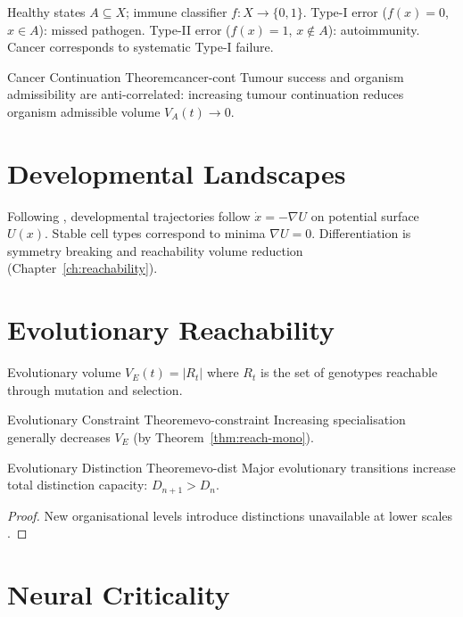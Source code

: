 \documentclass[12pt,twoside,openright]{book}
\begin{document}
Healthy states $A \subseteq X$; immune classifier
$f: X \to \{0,1\}$.
Type-I error ($f(x)=0$, $x \in A$): missed pathogen.
Type-II error ($f(x)=1$, $x \notin A$): autoimmunity.
Cancer corresponds to systematic Type-I failure.

\begin{theorem}{Cancer Continuation Theorem}{cancer-cont}
  Tumour success and organism admissibility are
  anti-correlated: increasing tumour continuation reduces
  organism admissible volume $V_A(t) \to 0$.
\end{theorem}

\section{Developmental Landscapes}

Following \textcite{waddington1957strategy},
developmental trajectories follow $\dot{x} = -\nabla U$
on potential surface $U(x)$.
Stable cell types correspond to minima $\nabla U = 0$.
Differentiation is symmetry breaking and reachability
volume reduction (Chapter~\ref{ch:reachability}).

\section{Evolutionary Reachability}

Evolutionary volume $V_E(t) = |R_t|$ where $R_t$ is
the set of genotypes reachable through mutation and
selection.

\begin{theorem}{Evolutionary Constraint Theorem}{evo-constraint}
  Increasing specialisation generally decreases $V_E$
  (by Theorem~\ref{thm:reach-mono}).
\end{theorem}

\begin{theorem}{Evolutionary Distinction Theorem}{evo-dist}
  Major evolutionary transitions increase total
  distinction capacity: $D_{n+1} > D_n$.
\end{theorem}

\begin{proof}
  New organisational levels introduce distinctions
  unavailable at lower scales
  \parencite{maynard-smith1995major}.
\end{proof}

\section{Neural Criticality}
\end{document}
